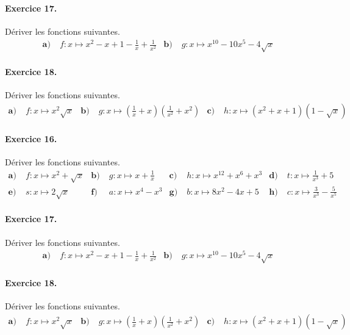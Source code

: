 \documentclass[11pt]{article}
\begin{document}
\paragraph{Exercice 17.} Dériver les fonctions suivantes.
\begin{align*}
  \textbf{a)}\;& f:x\mapsto x^2-x+1-\frac{1}{x}+\frac{1}{x^2} &
  \textbf{b)}\;& g:x\mapsto x^{10}-10x^5-4\sqrt x
\end{align*}

\paragraph{Exercice 18.} Dériver les fonctions suivantes.
\begin{align*}
  \textbf{a)}\;& f:x\mapsto x^2\sqrt{x} &
  \textbf{b)}\;& g:x\mapsto
  \left(\frac{1}{x}+x\right)\left(\frac{1}{x^2}+x^2\right) &
  \textbf{c)}\;& h:x\mapsto (x^2+x+1)(1-\sqrt{x})
\end{align*}
\vspace{2cm}
\paragraph{Exercice 16.} Dériver les fonctions suivantes.
\begin{align*}
  \textbf{a)}\;& f:x\mapsto x^2+\sqrt x &
  \textbf{b)}\;& g:x\mapsto x+\frac{1}{x} &
  \textbf{c)}\;& h:x\mapsto x^{12}+x^{6}+x^3 &
  \textbf{d)}\;& t:x\mapsto \frac{1}{x^3} + 5 \\
  \textbf{e)}\;& s:x\mapsto 2\sqrt x &
  \textbf{f)}\;& a:x\mapsto x^4-x^3 &
  \textbf{g)}\;& b:x\mapsto 8x^2-4x+5 &
  \textbf{h)}\;& c:x\mapsto \frac{3}{x^3} - \frac{5}{x^5}
\end{align*}

\paragraph{Exercice 17.} Dériver les fonctions suivantes.
\begin{align*}
  \textbf{a)}\;& f:x\mapsto x^2-x+1-\frac{1}{x}+\frac{1}{x^2} &
  \textbf{b)}\;& g:x\mapsto x^{10}-10x^5-4\sqrt x
\end{align*}

\paragraph{Exercice 18.} Dériver les fonctions suivantes.
\begin{align*}
  \textbf{a)}\;& f:x\mapsto x^2\sqrt{x} &
  \textbf{b)}\;& g:x\mapsto
  \left(\frac{1}{x}+x\right)\left(\frac{1}{x^2}+x^2\right) &
  \textbf{c)}\;& h:x\mapsto (x^2+x+1)(1-\sqrt{x})
\end{align*}
\end{document}
